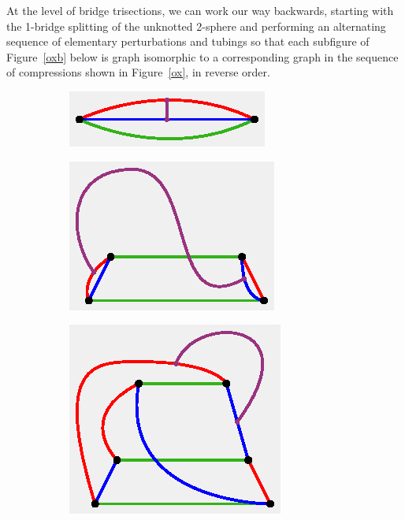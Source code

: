 \documentclass[11pt, oneside]{amsart}
\theoremstyle{theorem}
\theoremstyle{definition}
\theoremstyle{theorem}
\begin{document}
At the level of bridge trisections, we can work our way backwards, starting with the 1-bridge splitting of the unknotted 2-sphere and performing an alternating sequence of elementary perturbations and tubings so that each subfigure of Figure~\ref{oxb} below is graph isomorphic to a corresponding graph in the sequence of compressions shown in Figure~\ref{ox}, in reverse order.

\begin{figure}[h!]
\begin{subfigure}{.24\textwidth}
  \centering
  \includegraphics[width=.9\linewidth]{hbt1.eps}
  \label{oxb1}
\end{subfigure}%
\begin{subfigure}{.24\textwidth}
  \centering
  \includegraphics[width=.9\linewidth]{hbt2.eps}
  \label{oxb2}
\end{subfigure}
\begin{subfigure}{.24\textwidth}
  \centering
  \includegraphics[width=.9\linewidth]{hbt3.eps}

\end{subfigure}
\end{figure}
\end{document}
